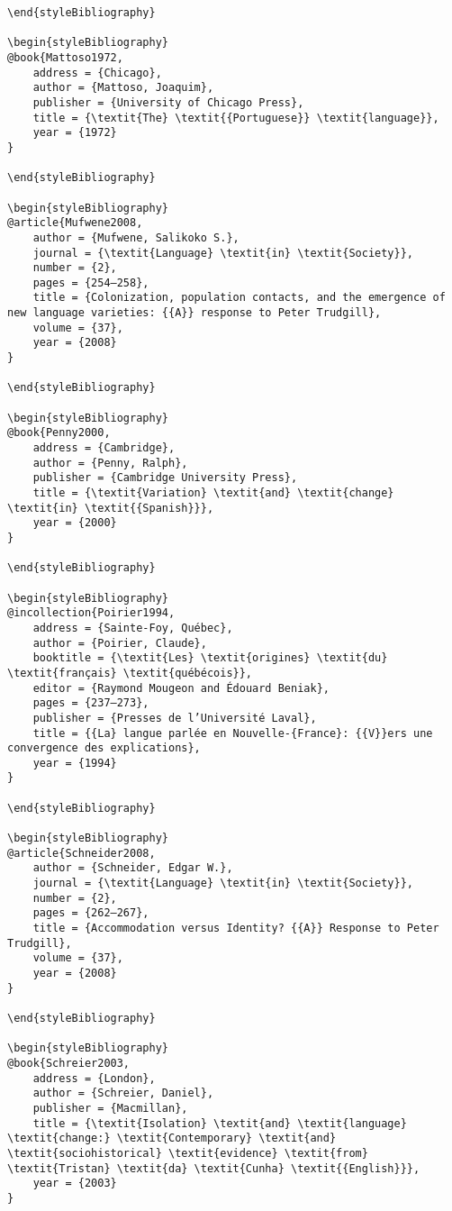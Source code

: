 \documentclass[output=paper]{langsci/langscibook}
\begin{document}
\begin{verbatim}
\end{styleBibliography}

\begin{styleBibliography}
@book{Mattoso1972,
	address = {Chicago},
	author = {Mattoso, Joaquim},
	publisher = {University of Chicago Press},
	title = {\textit{The} \textit{{Portuguese}} \textit{language}},
	year = {1972}
}

\end{styleBibliography}

\begin{styleBibliography}
@article{Mufwene2008,
	author = {Mufwene, Salikoko S.},
	journal = {\textit{Language} \textit{in} \textit{Society}},
	number = {2},
	pages = {254–258},
	title = {Colonization, population contacts, and the emergence of new language varieties: {{A}} response to Peter Trudgill},
	volume = {37},
	year = {2008}
}

\end{styleBibliography}

\begin{styleBibliography}
@book{Penny2000,
	address = {Cambridge},
	author = {Penny, Ralph},
	publisher = {Cambridge University Press},
	title = {\textit{Variation} \textit{and} \textit{change} \textit{in} \textit{{Spanish}}},
	year = {2000}
}

\end{styleBibliography}

\begin{styleBibliography}
@incollection{Poirier1994,
	address = {Sainte-Foy, Québec},
	author = {Poirier, Claude},
	booktitle = {\textit{Les} \textit{origines} \textit{du} \textit{français} \textit{québécois}},
	editor = {Raymond Mougeon and Édouard Beniak},
	pages = {237–273},
	publisher = {Presses de l’Université Laval},
	title = {{La} langue parlée en Nouvelle-{France}: {{V}}ers une convergence des explications},
	year = {1994}
}

\end{styleBibliography}

\begin{styleBibliography}
@article{Schneider2008,
	author = {Schneider, Edgar W.},
	journal = {\textit{Language} \textit{in} \textit{Society}},
	number = {2},
	pages = {262–267},
	title = {Accommodation versus Identity? {{A}} Response to Peter Trudgill},
	volume = {37},
	year = {2008}
}

\end{styleBibliography}

\begin{styleBibliography}
@book{Schreier2003,
	address = {London},
	author = {Schreier, Daniel},
	publisher = {Macmillan},
	title = {\textit{Isolation} \textit{and} \textit{language} \textit{change:} \textit{Contemporary} \textit{and} \textit{sociohistorical} \textit{evidence} \textit{from} \textit{Tristan} \textit{da} \textit{Cunha} \textit{{English}}},
	year = {2003}
}


\end{verbatim}
\end{document}
